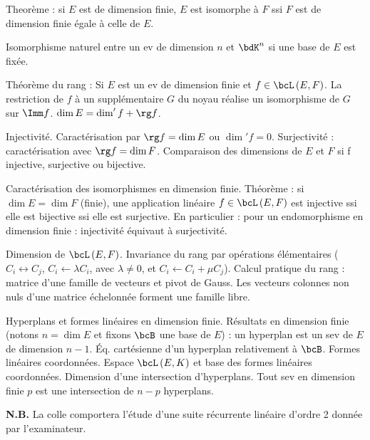 \documentclass[a4paper,french,bookmarks]{article}
\begin{document}
\begin{enumerate}
    \ithand Theorème : si $E$ est de dimension finie, $E$ est isomorphe à $F$ ssi $F$ est de dimension finie égale à celle de $E$.
    
    Isomorphisme naturel entre un ev de dimension $n$ et $\bdK^n$ si une base de $E$ est fixée.
    
    \ithand Théorème du rang : Si $E$ est un ev de dimension finie et $f \in \bcL\left(E, F\right)$. La restriction de $f$ à un supplémentaire $G$ du noyau réalise un isomorphisme de $G$ sur $\Imm f$. $\dim E = \dim ' f + \rg f$.
    
    \ithand Injectivité. Caractérisation par $\rg f = \dim E$ ou $\dim ' f = 0$. Surjectivité : caractérisation avec $\rg f = \dim F$. Comparaison des dimensions de $E$ et $F$ si f injective, surjective ou bijective.
    
    \ithand Caractérisation des isomorphismes en dimension finie. Théorème : si $\dim E = \dim F$ (finie), une application linéaire $f \in \bcL\left(E, F\right)$ est injective ssi elle est bijective ssi elle est surjective. En particulier : pour un endomorphisme en dimension finie : injectivité équivaut à surjectivité.
    
    \ithand  Dimension de $\bcL\left(E, F\right)$. Invariance du rang par opérations élémentaires ($C_i \leftrightarrow C_j$, $C_i \leftarrow \lambda C_i$, avec $\lambda \neq 0$, et $C_i \leftarrow C_i + \mu C_j$). Calcul pratique du rang : matrice d'une famille de vecteurs et pivot de Gauss. Les vecteurs colonnes non nuls d'une matrice échelonnée forment une famille libre.
    
    \ithand Hyperplans et formes linéaires en dimension finie. Résultats en dimension finie (notons $n = \dim E$ et fixons $\bcB$ une base de $E$) : un hyperplan est un sev de $E$ de dimension $n - 1$. Éq. cartésienne d'un hyperplan relativement à $\bcB$. Formes linéaires coordonnées. Espace $\bcL\left(E,K\right)$ et base des formes linéaires coordonnées. Dimension d'une intersection d'hyperplans. Tout sev en dimension finie $p$ est une intersection de $n − p$ hyperplans.
\end{enumerate}

\questionsdecours

\textbf{\sffamily N.B.} La colle comportera l'étude d'une suite récurrente linéaire d'ordre 2 donnée par l'examinateur.
\end{document}
